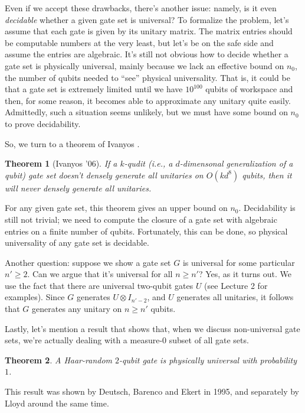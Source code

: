 \documentclass[12pt]{report}
\theoremstyle{plain}
\newtheorem{theorem}{Theorem}[section]
\theoremstyle{definition}
\begin{document}
Even if we accept these drawbacks, there's another issue: namely, is it even {\em decidable} whether a given gate set is universal? To formalize the problem, let's assume that each gate is given by its unitary matrix.  The matrix entries should be computable numbers at the very least, but let's be on the safe side and assume the entries are algebraic.  It's still not obvious how to decide whether a gate set is physically universal, mainly because we lack an effective bound on $n_0$, the number of qubits needed to ``see'' physical universality.  That is, it could be that a gate set is extremely limited until we have $10^{100}$ qubits of workspace and then, for some reason, it becomes able to approximate any unitary quite easily.  Admittedly, such a situation seems unlikely, but we must have some bound on $n_0$ to prove decidability.

So, we turn to a theorem of Ivanyos \cite{Ivanyos}.

\begin{theorem}[Ivanyos '06]
If a $k$-qudit (i.e., a $d$-dimensonal generalization of a qubit) gate set doesn't densely generate all unitaries on $O(kd^{8})$ qubits, then it will never densely generate all unitaries.
\end{theorem}

For any given gate set, this theorem gives an upper bound on $n_0$. Decidability is still not trivial; we need to compute the closure of a gate set with algebraic entries on a finite number of qubits. Fortunately, this can be done, so physical universality of any gate set is decidable.

Another question: suppose we show a gate set $G$ is universal for some particular $n' \geq 2$.  Can we argue that it's universal for all $n \geq n'$?  Yes, as it turns out.  We use the fact that there are universal two-qubit gates $U$ (see Lecture 2 for examples).  Since $G$ generates $U \otimes I_{n'-2}$, and $U$ generates all unitaries, it follows that $G$ generates any unitary on $n \geq n'$ qubits.

Lastly, let's mention a result that shows that, when we discuss non-universal gate sets, we're actually dealing with a measure-0 subset of all gate sets.

\begin{theorem}
A Haar-random $2$-qubit gate is physically universal with probability $1$.
\end{theorem}

This result was shown by Deutsch, Barenco and Ekert \cite{deutsch} in 1995, and separately by Lloyd \cite{lloyd} around the same time.
\end{document}
